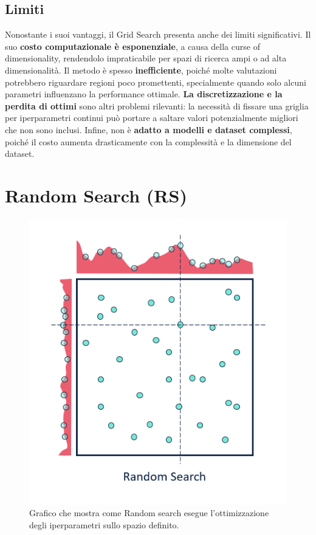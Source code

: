 \documentclass[a4paper,12pt]{report}
\begin{document}
	\subsection{Limiti}
	Nonostante i suoi vantaggi, il Grid Search presenta anche dei limiti significativi. Il suo \textbf{costo computazionale è esponenziale}, a causa della curse of dimensionality, rendendolo impraticabile per spazi di ricerca ampi o ad alta dimensionalità. Il metodo è spesso \textbf{inefficiente}, poiché molte valutazioni potrebbero riguardare regioni poco promettenti, specialmente quando solo alcuni parametri influenzano la performance ottimale. \textbf{La discretizzazione e la perdita di ottimi} sono altri problemi rilevanti: la necessità di fissare una griglia per iperparametri continui può portare a saltare valori potenzialmente migliori che non sono inclusi. Infine, non è \textbf{adatto a modelli e dataset complessi}, poiché il costo aumenta drasticamente con la complessità e la dimensione del dataset.
	
	\section{Random Search (RS)}
	\begin{figure}[H]
		\centering
		\includegraphics[width=1.0\textwidth]{img/rs.png}
		\caption{Grafico che mostra come Random search esegue l'ottimizzazione degli iperparametri sullo spazio definito.}
	\end{figure}
\end{document}
